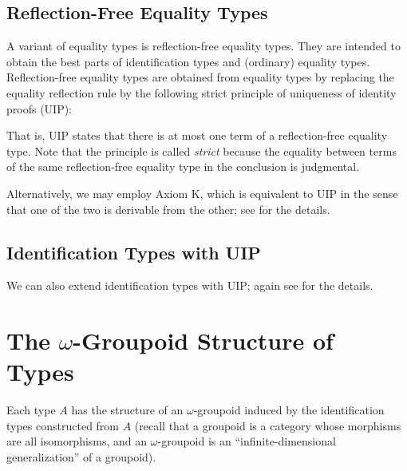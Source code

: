 \documentclass[11pt]{article}
\begin{document}
\subsection{Reflection-Free Equality Types}
A variant of equality types is reflection-free equality types. They are intended to obtain the best parts of identification types and (ordinary) equality types. Reflection-free equality types are obtained from equality types by replacing the equality reflection rule by the following strict principle of uniqueness of identity proofs (UIP):

\begin{prooftree*}
\end{prooftree*}

That is, UIP states that there is at most one term of a reflection-free equality type.
Note that the principle is called \emph{strict} because the equality between terms of the same reflection-free equality type in the conclusion is judgmental. 

Alternatively, we may employ Axiom K, which is equivalent to UIP in the sense that one of the two is derivable from the other; see \cite{hott-as:book} for the details. 

\subsection{Identification Types with UIP}

We can also extend identification types with UIP; again see \cite{hott-as:book} for the details. 

\section{The $\omega$-Groupoid Structure of Types}

\begin{theorem}
Each type $A$ has the structure of an $\omega$-groupoid induced by the identification types constructed from $A$ (recall that a groupoid is a category whose morphisms are all isomorphisms, and an $\omega$-groupoid is an ``infinite-dimensional generalization'' of a groupoid).
\end{theorem}
\end{document}
